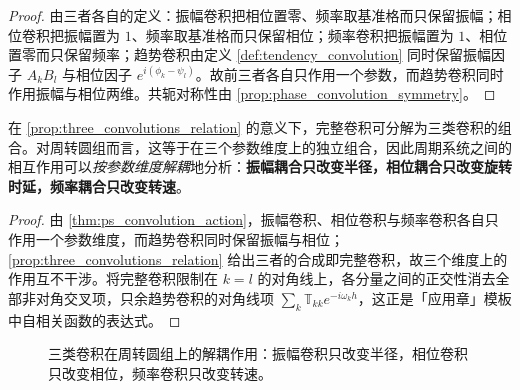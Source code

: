 \begin{proof}
由三者各自的定义：振幅卷积把相位置零、频率取基准格而只保留振幅；相位卷积把振幅置为 $1$、频率取基准格而只保留相位；频率卷积把振幅置为 $1$、相位置零而只保留频率；趋势卷积由定义 \cref{def:tendency_convolution} 同时保留振幅因子 $A_kB_l$ 与相位因子 $e^{i(\phi_k-\psi_l)}$。故前三者各自只作用一个参数，而趋势卷积同时作用振幅与相位两维。共轭对称性由 \cref{prop:phase_convolution_symmetry}。
\end{proof}

\begin{proposition}[三类卷积的因式分解]\label{prop:ps_convolution_factorization}
在 \cref{prop:three_convolutions_relation} 的意义下，完整卷积可分解为三类卷积的组合。对周转圆组而言，这等于在三个参数维度上的独立组合，因此周期系统之间的相互作用可以\emph{按参数维度解耦}地分析：\textbf{振幅耦合只改变半径，相位耦合只改变旋转时延，频率耦合只改变转速}。
\end{proposition}

\begin{proof}
由 \cref{thm:ps_convolution_action}，振幅卷积、相位卷积与频率卷积各自只作用一个参数维度，而趋势卷积同时保留振幅与相位；\cref{prop:three_convolutions_relation} 给出三者的合成即完整卷积，故三个维度上的作用互不干涉。将完整卷积限制在 $k=l$ 的对角线上，各分量之间的正交性消去全部非对角交叉项，只余趋势卷积的对角线项 $\sum_k\mathbb T_{kk}e^{-i\omega_kh}$，这正是「应用章」模板中自相关函数的表达式。
\end{proof}

\begin{figure}[htbp]
\centering
{}
\caption{三类卷积在周转圆组上的解耦作用：振幅卷积只改变半径，相位卷积只改变相位，频率卷积只改变转速。}
\label{fig:ps_convolution_decoupling}
\end{figure}

